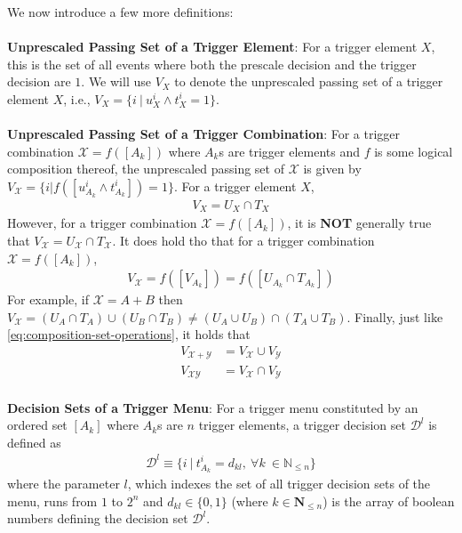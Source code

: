 We now introduce a few more definitions:\\\\
\textbf{Unprescaled Passing Set of a Trigger Element}: For a trigger element $X$, this is the set of all events where both the prescale decision and the trigger decision are $1$. We will use $V_X$ to denote the unprescaled passing set of a trigger element $X$, i.e., $V_X=\{i\ \vert\ u^i_X\land t^i_X=1\}$.\\\\
\textbf{Unprescaled Passing Set of a Trigger Combination}: For a trigger combination $\mathcal{X}=f([A_k])$ where $A_k$s are trigger elements and $f$ is some logical composition thereof, the unprescaled passing set of $\mathcal{X}$ is given by $V_\mathcal{X}=\{i\vert f([u_{A_k}^i\land t^i_{A_k}])=1\}$. %
For a trigger element $X$, 
        \begin{align}
            V_X=U_X\cap T_X
        \end{align}
However, for a trigger combination $\mathcal{X}=f([A_k])$, it is \textbf{NOT} generally true that $V_\mathcal{X}=U_\mathcal{X}\cap T_\mathcal{X}$. %
It does hold tho that for a trigger combination $\mathcal{X}=f([A_k])$,
        \begin{align}
        V_\mathcal{X}=f([V_{A_k}])=f([U_{A_k}\cap T_{A_k}])
        \end{align}
For example, if $\mathcal{X}=A+B$ then $V_\mathcal{X}=(U_A\cap T_A)\cup (U_B\cap T_B)\neq (U_A\cup U_B)\cap (T_A\cup T_B)$. %
Finally, just like \eqref{eq:composition-set-operations}, it holds that 
        \begin{subequations}
        \label{eq:composition-set-operations-on-v}
        \begin{align}
            V_\mathcal{X+Y}&=V_\mathcal{X}\cup V_\mathcal{Y}\\
            V_\mathcal{XY}&=V_\mathcal{X}\cap V_\mathcal{Y}
        \end{align}
        \end{subequations}
\\
\textbf{Decision Sets of a Trigger Menu}: For a trigger menu constituted by an ordered set $[A_k]$ where $A_k$s are $n$ trigger elements, a trigger decision set $\mathcal{D}^{l}$ is defined as 
    \begin{align}
        \mathcal{D}^{l}\equiv\{i\ \vert\ t^i_{A_k}=d_{kl},\ \forall k\ \in \mathbb{N}_{\leq n}\} 
    \end{align}
where the parameter $l$, which indexes the set of all trigger decision sets of the menu, runs from $1$ to $2^n$ and $d_{kl}\in \{0,1\}$ (where $k\in \mathbf{N}_{\leq n}$) is the array of boolean numbers defining the decision set $\mathcal{D}^l$.  %
